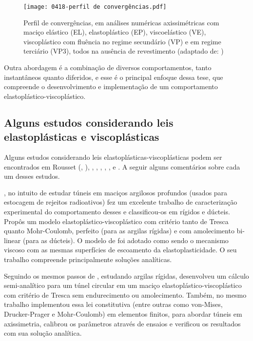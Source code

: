 \begin{figure}[H]
	\begin{center}
		\texttt{[image: 0418-perfil de convergências.pdf]}
	\end{center}
	\caption{\label{perfil_convergencias_sterpi}Perfil de convergências, em análises numéricas axissimétricas com maciço elástico (EL), elastoplástico (EP), viscoelástico (VE), viscoplástico com fluência no regime secundário (VP) e em regime terciário (VP3), todos na ausência de revestimento (adaptado de: )}
\end{figure}

Outra abordagem é a combinação de diversos comportamentos, tanto instantâneos quanto diferidos, e esse é o principal enfoque dessa tese, que compreende o desenvolvimento e implementação de um comportamento elastoplástico-viscoplástico.

\subsection{Alguns estudos considerando leis elastoplásticas e viscoplásticas}

Alguns estudos considerando leis elastoplásticas-viscoplásticas podem ser encontrados em Rousset (\citeyear{Rousset1988}, \citeyear{Rousset1990}), , , , , ,  e . A seguir alguns comentários sobre cada um desses estudos.

\textbf{}, no intuito de estudar túneis em maciços argilosos profundos (usados para estocagem de rejeitos radioativos) fez um excelente trabalho de caracterização experimental do comportamento desses e classificou-os em rígidos e dúcteis. Propôs um modelo elastoplástico-viscoplástico com critério tanto de Tresca quanto Mohr-Coulomb, perfeito (para as argilas rígidas) e com amolecimento bi-linear (para as dúcteis). O modelo de  foi adotado como sendo o mecanismo viscoso com as mesmas superfícies de escoamento da elastoplasticidade. O seu trabalho compreende principalmente soluções analíticas.

Seguindo os mesmos passos de , \textbf{} estudando argilas rígidas, desenvolveu um cálculo semi-analítico para um túnel circular em um maciço elastoplástico-viscoplástico com critério de Tresca sem endurecimento ou amolecimento. Também, no mesmo trabalho implementou essa lei constitutiva (entre outras como von-Mises, Drucker-Prager e Mohr-Coulomb) em elementos finitos, para abordar túneis em axissimetria, calibrou os parâmetros através de ensaios e verificou os resultados com sua solução analítica.

